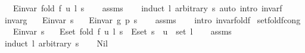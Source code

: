 \begin{isabellebody}
\ \ \ {\isachardoublequoteopen}E{\isachardot}{\kern0pt}invar\ {\isacharparenleft}{\kern0pt}fold\ {\isacharparenleft}{\kern0pt}f\ u{\isacharparenright}{\kern0pt}\ l\ s{\isacharparenright}{\kern0pt}{\isachardoublequoteclose}\isanewline
%
\isadelimproof
\ \ %
\endisadelimproof
%
\isatagproof
{}\isamarkupfalse%
\ assms\isanewline
\ \ \isamarkupfalse%
\ {\isacharparenleft}{\kern0pt}induct\ l\ arbitrary{\isacharcolon}{\kern0pt}\ s{\isacharparenright}{\kern0pt}\ {\isacharparenleft}{\kern0pt}auto\ intro{\isacharcolon}{\kern0pt}\ invar{\isacharunderscore}{\kern0pt}f{\isacharparenright}{\kern0pt}%
\endisatagproof
{\isafoldproof}%
%
\isadelimproof
\isanewline
%
\endisadelimproof
\isanewline
{}\isamarkupfalse%
\ invar{\isacharunderscore}{\kern0pt}g{\isacharcolon}{\kern0pt}\isanewline
\ \ \ {\isachardoublequoteopen}E{\isachardot}{\kern0pt}invar\ s{\isachardoublequoteclose}\isanewline
\ \ \ {\isachardoublequoteopen}E{\isachardot}{\kern0pt}invar\ {\isacharparenleft}{\kern0pt}g\ p\ s{\isacharparenright}{\kern0pt}{\isachardoublequoteclose}\isanewline
%
\isadelimproof
\ \ %
\endisadelimproof
%
\isatagproof
{}\isamarkupfalse%
\ assms\isanewline
\ \ \isamarkupfalse%
\ {\isacharparenleft}{\kern0pt}intro\ invar{\isacharunderscore}{\kern0pt}fold{\isacharunderscore}{\kern0pt}f{\isacharparenright}{\kern0pt}%
\endisatagproof
{\isafoldproof}%
%
\isadelimproof
\isanewline
%
\endisadelimproof
\isanewline
{}\isamarkupfalse%
\ set{\isacharunderscore}{\kern0pt}fold{\isacharunderscore}{\kern0pt}f{\isacharunderscore}{\kern0pt}cong{\isacharcolon}{\kern0pt}\isanewline
\ \ \ {\isachardoublequoteopen}E{\isachardot}{\kern0pt}invar\ s{\isachardoublequoteclose}\isanewline
\ \ \ {\isachardoublequoteopen}E{\isachardot}{\kern0pt}set\ {\isacharparenleft}{\kern0pt}fold\ {\isacharparenleft}{\kern0pt}f\ u{\isacharparenright}{\kern0pt}\ l\ s{\isacharparenright}{\kern0pt}\ {\isacharequal}{\kern0pt}\ E{\isachardot}{\kern0pt}set\ s\ {\isasymunion}\ {\isacharbraceleft}{\kern0pt}u{\isacharbraceright}{\kern0pt}\ {\isasymtimes}\ set\ l{\isachardoublequoteclose}\isanewline
%
\isadelimproof
\ \ %
\endisadelimproof
%
\isatagproof
{}\isamarkupfalse%
\ assms\isanewline
{}\isamarkupfalse%
\ {\isacharparenleft}{\kern0pt}induct\ l\ arbitrary{\isacharcolon}{\kern0pt}\ s{\isacharparenright}{\kern0pt}\isanewline
\ \ \isamarkupfalse%
\ Nil\isanewline
\ \ \isamarkupfalse%

\end{isabellebody}
